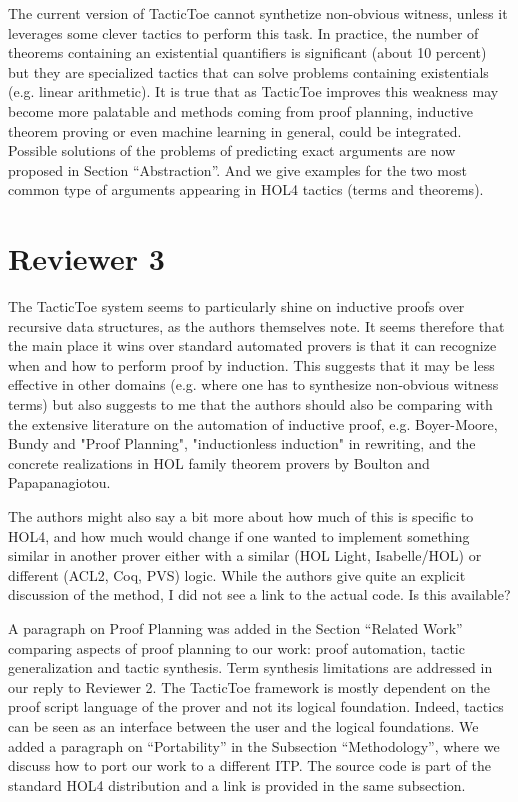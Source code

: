 \documentclass[]{scrartcl}
\begin{document}
The current version of TacticToe cannot synthetize non-obvious 
witness, unless it leverages some clever 
tactics to perform this task. In practice, the number of theorems containing 
an existential quantifiers is significant (about 10 percent) but they are 
specialized tactics that can solve problems containing existentials (e.g. 
linear arithmetic). It is true that as TacticToe improves this weakness 
may become more palatable and methods coming from proof planning, inductive 
theorem proving or even machine learning in general, could be integrated.
Possible solutions of the problems of predicting exact arguments are now 
proposed in Section ``Abstraction''. And we give examples for the two most 
common type of arguments appearing in HOL4 tactics (terms and theorems).

\section*{Reviewer 3}

\begin{leftbar}
The TacticToe system seems to particularly shine on inductive proofs over
recursive data structures, as the authors themselves note. It seems
therefore that the main place it wins over standard automated provers is
that it can recognize when and how to perform proof by induction. This
suggests that it may be less effective in other domains (e.g. where one has
to synthesize non-obvious witness terms) but also suggests to me that the
authors should also be comparing with the extensive literature on the
automation of inductive proof, e.g. Boyer-Moore, Bundy and "Proof
Planning", "inductionless induction" in rewriting, and the concrete
realizations in HOL family theorem provers by Boulton and Papapanagiotou.

The authors might also say a bit more about how much of this is specific to
HOL4, and how much would change if one wanted to implement something
similar in another prover either with a similar (HOL Light, Isabelle/HOL)
or different (ACL2, Coq, PVS) logic. While the authors give quite an
explicit discussion of the method, I did not see a link to the actual code.
Is this available?
\end{leftbar}

A paragraph on Proof Planning was added in the Section ``Related Work'' 
comparing aspects of proof planning to our work: proof automation, tactic 
generalization and tactic synthesis. Term synthesis limitations are
addressed in our reply to Reviewer 2.
The TacticToe framework is mostly dependent on the proof script language of the 
prover and not its logical foundation. Indeed, tactics can be seen as an 
interface between the user and the logical foundations. We added a 
paragraph on ``Portability'' in the Subsection ``Methodology'', where we 
discuss how to port our work to a different ITP. The source code is part of the 
standard HOL4 distribution and a link is provided in the same subsection.
\end{document}
